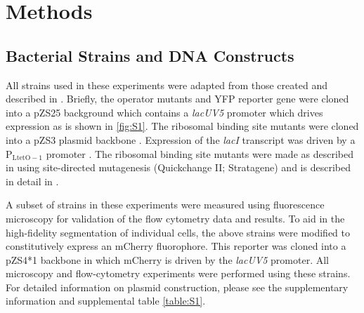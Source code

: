 \pagebreak
\section*{Methods }


\subsection*{Bacterial Strains and DNA Constructs}
All strains used in these experiments were adapted from those created and
described in \citep{Garcia2011} . Briefly, the operator mutants and YFP reporter
gene were cloned into a pZS25 background which contains a \textit{lacUV5}
promoter which drives expression as is shown in \ref{fig:S1}. The ribosomal
binding site mutants were cloned into a pZS3 plasmid backbone . Expression of
the \textit{lacI} transcript was driven by a P$_\mathrm{LtetO-1}$ promoter
\cite{Lutz1997}. The ribosomal binding site mutants were made as described in
\citep{Salis2009} using site-directed mutagenesis (Quickchange II; Stratagene)
and is described in detail in \citep{Garcia2011}.

A subset of strains in these experiments were measured using fluorescence
microscopy for validation of the flow cytometry data and results. To aid in the
high-fidelity segmentation of individual cells, the above strains were
modified to constitutively express an mCherry fluorophore. This reporter was
cloned into a pZS4*1 backbone in which mCherry is driven by the \textit{lacUV5} promoter.
All microscopy and flow-cytometry experiments were performed using these
strains. For detailed information on plasmid construction, please see the
supplementary information and supplemental table \ref{table:S1}.



